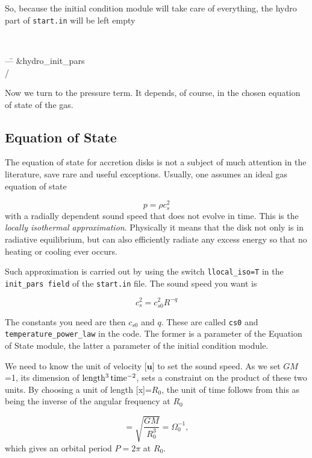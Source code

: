 \documentclass[a4paper,10pt]{article}
\renewcommand{\v}[1]{{\boldsymbol #1}} %
\begin{document}
So, because the initial condition module will take care of everything,
the hydro part of {\tt start.in} will be left empty

{\tt
\begin{tabbing}
  ---\=\kill
\&hydro\_init\_pars\\
/
\end{tabbing}
}


Now we turn to the pressure term. It depends, of course, in the chosen equation of state of the gas. 

\subsection{Equation of State}

The equation of state for accretion disks is not a subject of much
attention in the literature, save rare and useful exceptions. Usually, one assumes an ideal gas equation of state 

\begin{equation}
  p=\rho c_s^2
\end{equation}with a radially dependent sound speed that does not
evolve in time. This is the {\it locally isothermal
  approximation}. Physically it means that the disk not only is in
radiative equilibrium, but can also efficiently radiate any excess
energy so that no heating or cooling ever occurs. 

Such approximation is carried out by using the switch {\tt llocal\_iso=T} in the {\tt init\_pars field} of the {\tt start.in} file. The sound speed you want is 

\begin{equation}
c_s^2=c_{s0}^2 R^{-q}
\end{equation}

The constants you need are then $c_{s0}$ and $q$. These are called
{\tt cs0} and {\tt temperature\_power\_law} in the code. The former is a
parameter of the Equation of State module, the latter a parameter of
the initial condition module. 

We need to know the unit of velocity [$\v{u}$] to set the sound speed. As we set $GM$=1, its dimension of $\rm{length^3\,time^{-2}}$, sets a constraint on the product of these two units. By choosing a unit of length [x]=$R_0$, the unit of time follows from this as being the inverse of the angular frequency at $R_0$

\begin{equation}
[t] = \sqrt{\frac{GM}{R_0^3}} = \Omega_0^{-1},
\end{equation}which gives an orbital period $P=2\pi$ at $R_0$.
\end{document}
